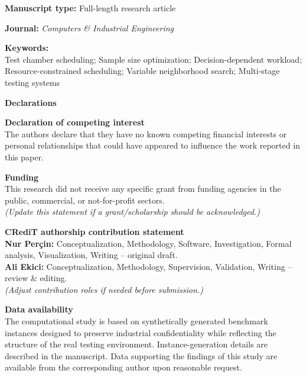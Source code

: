 \documentclass[11pt]{article}
\begin{document}
\vspace{1.4em}

\noindent
\textbf{Manuscript type:} Full-length research article

\vspace{0.8em}

\noindent
\textbf{Journal:} \emph{Computers \& Industrial Engineering}

\vspace{0.8em}

\noindent
\textbf{Keywords:}\\
Test chamber scheduling; Sample size optimization; Decision-dependent workload; Resource-constrained scheduling; Variable neighborhood search; Multi-stage testing systems

\vspace{1.2em}

\noindent
\textbf{Declarations}

\vspace{0.5em}

\noindent
\textbf{Declaration of competing interest}\\
The authors declare that they have no known competing financial interests or personal relationships that could have appeared to influence the work reported in this paper.

\vspace{0.7em}

\noindent
\textbf{Funding}\\
This research did not receive any specific grant from funding agencies in the public, commercial, or not-for-profit sectors.\\
\textit{(Update this statement if a grant/scholarship should be acknowledged.)}

\vspace{0.7em}

\noindent
\textbf{CRediT authorship contribution statement}\\
\textbf{Nur Per\c{c}in:} Conceptualization, Methodology, Software, Investigation, Formal analysis, Visualization, Writing -- original draft.\\
\textbf{Ali Ekici:} Conceptualization, Methodology, Supervision, Validation, Writing -- review \& editing.\\
\textit{(Adjust contribution roles if needed before submission.)}

\vspace{0.7em}

\noindent
\textbf{Data availability}\\
The computational study is based on synthetically generated benchmark instances designed to preserve industrial confidentiality while reflecting the structure of the real testing environment. Instance-generation details are described in the manuscript. Data supporting the findings of this study are available from the corresponding author upon reasonable request.
\end{document}
